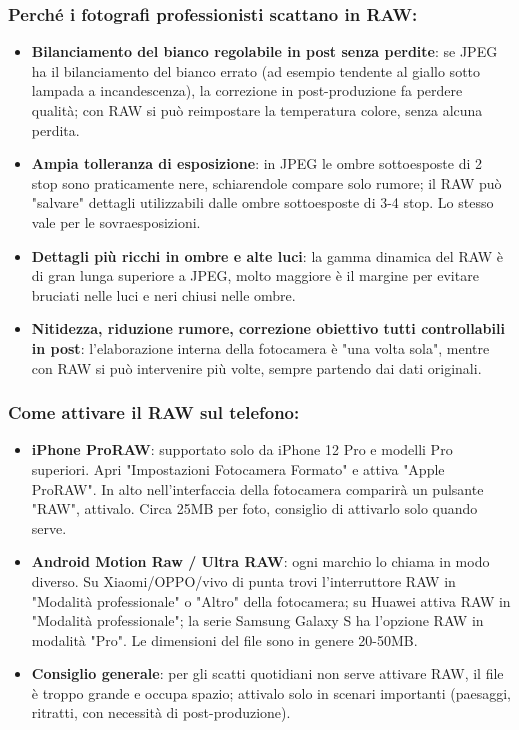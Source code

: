 \subsubsection*{Perché i fotografi professionisti scattano in RAW:}

\begin{itemize}
  \item \textbf{Bilanciamento del bianco regolabile in post senza perdite}: se JPEG ha il bilanciamento del bianco errato (ad esempio tendente al giallo sotto lampada a incandescenza), la correzione in post-produzione fa perdere qualità; con RAW si può reimpostare la temperatura colore, senza alcuna perdita.
  \item \textbf{Ampia tolleranza di esposizione}: in JPEG le ombre sottoesposte di 2 stop sono praticamente nere, schiarendole compare solo rumore; il RAW può "salvare" dettagli utilizzabili dalle ombre sottoesposte di 3-4 stop. Lo stesso vale per le sovraesposizioni.
  \item \textbf{Dettagli più ricchi in ombre e alte luci}: la gamma dinamica del RAW è di gran lunga superiore a JPEG, molto maggiore è il margine per evitare bruciati nelle luci e neri chiusi nelle ombre.
  \item \textbf{Nitidezza, riduzione rumore, correzione obiettivo tutti controllabili in post}: l'elaborazione interna della fotocamera è "una volta sola", mentre con RAW si può intervenire più volte, sempre partendo dai dati originali.
\end{itemize}

\subsubsection*{Come attivare il RAW sul telefono:}

\begin{itemize}
  \item \textbf{iPhone ProRAW}: supportato solo da iPhone 12 Pro e modelli Pro superiori. Apri "Impostazioni Fotocamera Formato" e attiva "Apple ProRAW". In alto nell'interfaccia della fotocamera comparirà un pulsante "RAW", attivalo. Circa 25MB per foto, consiglio di attivarlo solo quando serve.
  \item \textbf{Android Motion Raw / Ultra RAW}: ogni marchio lo chiama in modo diverso. Su Xiaomi/OPPO/vivo di punta trovi l'interruttore RAW in "Modalità professionale" o "Altro" della fotocamera; su Huawei attiva RAW in "Modalità professionale"; la serie Samsung Galaxy S ha l'opzione RAW in modalità "Pro". Le dimensioni del file sono in genere 20-50MB.
  \item \textbf{Consiglio generale}: per gli scatti quotidiani non serve attivare RAW, il file è troppo grande e occupa spazio; attivalo solo in scenari importanti (paesaggi, ritratti, con necessità di post-produzione).
\end{itemize}

